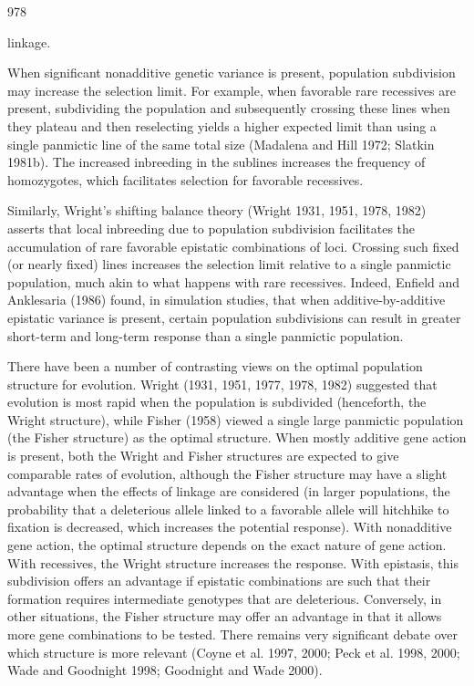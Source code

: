 \documentclass{article}
\begin{document}
{978

linkage.

When significant nonadditive genetic variance is present, population subdivision may increase the selection limit. For example, when favorable rare recessives are present, subdividing the population and subsequently crossing these lines when they plateau and then reselecting yields a higher expected limit than using a single panmictic line of the same total size (Madalena and Hill 1972; Slatkin 1981b). The increased inbreeding in the sublines increases the frequency of homozygotes, which facilitates selection for favorable recessives.

Similarly, Wright's shifting balance theory (Wright 1931, 1951, 1978, 1982) asserts that local inbreeding due to population subdivision facilitates the accumulation of rare favorable epistatic combinations of loci. Crossing such fixed (or nearly fixed) lines increases the selection limit relative to a single panmictic population, much akin to what happens with rare recessives. Indeed, Enfield and Anklesaria (1986) found, in simulation studies, that when additive-by-additive epistatic variance is present, certain population subdivisions can result in greater short-term and long-term response than a single panmictic population.

There have been a number of contrasting views on the optimal population structure for evolution. Wright (1931, 1951, 1977, 1978, 1982) suggested that evolution is most rapid when the population is subdivided (henceforth, the Wright structure), while Fisher (1958) viewed a single large panmictic population (the Fisher structure) as the optimal structure. When mostly additive gene action is present, both the Wright and Fisher structures are expected to give comparable rates of evolution, although the Fisher structure may have a slight advantage when the effects of linkage are considered (in larger populations, the probability that a deleterious allele linked to a favorable allele will hitchhike to fixation is decreased, which increases the potential response). With nonadditive gene action, the optimal structure depends on the exact nature of gene action. With recessives, the Wright structure increases the response. With epistasis, this subdivision offers an advantage if epistatic combinations are such that their formation requires intermediate genotypes that are deleterious. Conversely, in other situations, the Fisher structure may offer an advantage in that it allows more gene combinations to be tested. There remains very significant debate over which structure is more relevant (Coyne et al. 1997, 2000; Peck et al. 1998, 2000; Wade and Goodnight 1998; Goodnight and Wade 2000).

}
\end{document}

